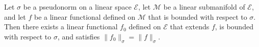 Let $\sigma$ be a pseudonorm on a linear space $\mathcal{E}$, let $\mathcal{M}$ be a linear submanifold of $\mathcal{E}$, and let $f$ be a linear functional defined on $\mathcal{M}$ that is bounded with respect to $\sigma$. Then there exists a linear functional $f_0$ defined on $\mathcal{E}$ that extends $f$, is bounded with respect to $\sigma$, and satisfies $\|f_0\|_\sigma = \|f\|_\sigma$.
